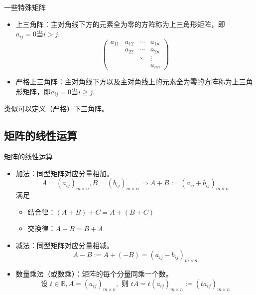 
\begin{frame}{一些特殊矩阵}

\begin{itemize}
\item 上三角阵：主对角线下方的元素全为零的方阵称为上三角形矩阵，即$a_{ij} = 0 \text{当$i > j$.}$
$$\begin{pmatrix}
a_{11} & a_{12} & \cdots & a_{1n} \\ & a_{22} & \cdots & a_{2n} \\ & & \ddots & \vdots \\ & & & a_{nn} 
\end{pmatrix}$$

\item 严格上三角阵：主对角线下方以及主对角线上的元素全为零的方阵称为上三角形矩阵，即$a_{ij} = 0 \text{当$i \geqslant j$.}$
\end{itemize}
类似可以定义（严格）下三角阵。

\end{frame}


\subsection{矩阵的线性运算} 


\begin{frame}{矩阵的线性运算}

\begin{itemize}
\item 加法：同型矩阵对应分量相加。
$$A = (a_{ij})_{m\times n}, B = (b_{ij})_{m\times n} \Rightarrow A + B := (a_{ij} + b_{ij})_{m\times n}$$
满足
\begin{itemize}
\item[$\bullet$] 结合律：$(A+B)+C = A+(B+C)$
\item[$\bullet$] 交换律：$A+B = B+A$
\end{itemize}
\item 减法：同型矩阵对应分量相减。
$$A - B := A + (-B) = (a_{ij} - b_{ij})_{m\times n}$$
\item 数量乘法（或数乘）：矩阵的每个分量同乘一个数。
$$\text{设 }t\in\mathbb{R}, A = (a_{ij})_{m\times n}, \text{ 则  } tA = t(a_{ij})_{m\times n} := (ta_{ij})_{m\times n}$$
\end{itemize}

\end{frame}

